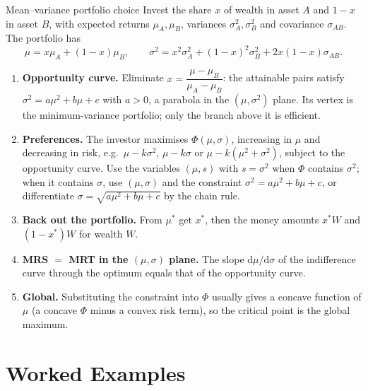 \begin{rulebox}{Mean--variance portfolio choice}
Invest the share $x$ of wealth in asset $A$ and $1-x$ in asset $B$, with
expected returns $\mu_A,\mu_B$, variances $\sigma_A^{2},\sigma_B^{2}$ and
covariance $\sigma_{AB}$. The portfolio has
\[
  \mu=x\mu_A+(1-x)\mu_B,\qquad
  \sigma^{2}=x^{2}\sigma_A^{2}+(1-x)^{2}\sigma_B^{2}+2x(1-x)\sigma_{AB}.
\]
\begin{enumerate}[leftmargin=1.8em,itemsep=0.3ex]
  \item \textbf{Opportunity curve.} Eliminate
        $x=\dfrac{\mu-\mu_B}{\mu_A-\mu_B}$: the attainable pairs satisfy
        $\sigma^{2}=a\mu^{2}+b\mu+c$ with $a>0$, a parabola in the
        $(\mu,\sigma^{2})$ plane. Its vertex is the minimum-variance
        portfolio; only the branch above it is efficient.
  \item \textbf{Preferences.} The investor maximises $\Phi(\mu,\sigma)$,
        increasing in $\mu$ and decreasing in risk, e.g.\
        $\mu-k\sigma^{2}$, $\mu-k\sigma$ or $\mu-k(\mu^{2}+\sigma^{2})$,
        subject to the opportunity curve. Use the variables $(\mu,s)$ with
        $s=\sigma^{2}$ when $\Phi$ contains $\sigma^{2}$; when it contains
        $\sigma$, use $(\mu,\sigma)$ and the constraint
        $\sigma^{2}=a\mu^{2}+b\mu+c$, or differentiate
        $\sigma=\sqrt{a\mu^{2}+b\mu+c}$ by the chain rule.
  \item \textbf{Back out the portfolio.} From $\mu^*$ get $x^*$, then the
        money amounts $x^*W$ and $(1-x^*)W$ for wealth $W$.
  \item \textbf{MRS $=$ MRT in the $(\mu,\sigma)$ plane.} The slope
        $\mathrm{d}\mu/\mathrm{d}\sigma$ of the indifference curve through
        the optimum equals that of the opportunity curve.
  \item \textbf{Global.} Substituting the constraint into $\Phi$ usually
        gives a concave function of $\mu$ (a concave $\Phi$ minus a convex
        risk term), so the critical point is the global maximum.
\end{enumerate}
\end{rulebox}

\section{Worked Examples}


